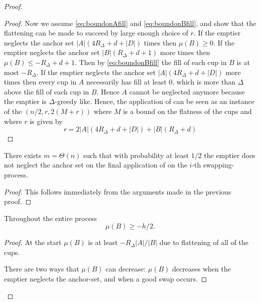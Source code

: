 \begin{proof}
\begin{proof}
  Now we assume \eqref{eq:boundonAfill} and
  \eqref{eq:boundonBfill}, and show that the flattening can be
  made to succeed by large enough choice of $r$. 
  If the emptier neglects the anchor set $|A|(4R_\Delta + d +
  |D|)$ times then $\mu(B) \ge 0$. If the emptier neglects the
  anchor set $|B|(R_\Delta + d + 1)$ more times then $\mu(B) \le
  -R_\Delta + d + 1$. Then by \eqref{eq:boundonBfill} the fill of
  each cup in $B$ is at most $-R_\Delta$. If the emptier neglects
  the anchor set $|A|(4R_\Delta + d +
  |D|)$ more times then every cup in $A$ necessarily has fill
  at least $0$, which is more than $\Delta$ above the fill of
  each cup in $B$. Hence $A$ cannot be neglected anymore
  because the emptier is $\Delta$-greedy like. Hence,
  the application of \flatalg can be seen as an instance of the
  $(n/2, r, 2(M + r))$ where $M$ is a bound on the flatness of
  the cups 
  and where $r$ is given by 
  $$r = 2|A|(4R_\Delta + d + |D|) + |B|(R_\Delta + d)$$


\end{proof}

\begin{clm}
  \label{clm:thereexistsmsuchthat}
  There exists $m=\Theta(n)$ such that with probability
  at least $1/2$ the emptier does not neglect the anchor set on
  the final application of \randalg on the $i$-th
  swapping-process.
\end{clm}
\begin{proof}
  This follows immediately from the arguments made in the
  previous proof.
\end{proof}


\begin{clm}
  \label{clm:muBdoesntSinkTooLow}
  Throughout the entire process
  $$\mu(B) \ge -h/2.$$
\end{clm}
\begin{proof}

  At the start $\mu(B)$ is at least $-R_\Delta |A|/|B|$ due to flattening
  of all of the cups.

  There are two ways that $\mu(B)$ can decrease: $\mu(B)$
  decreases when the emptier neglects the anchor-set, and
  when a good swap occurs. 


\end{proof}
\end{proof}

